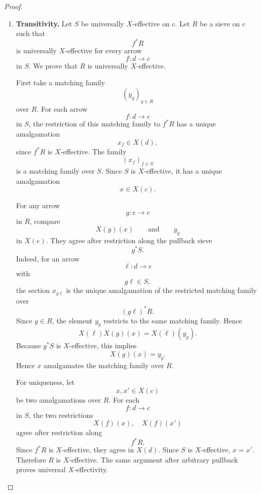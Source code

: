 \begin{proof}
\begin{enumerate}
        \item \textbf{Transitivity.}
        Let \(S\) be universally \(X\)-effective on \(c\). Let \(R\) be a
        sieve on \(c\) such that
        \[
            f^*R
        \]
        is universally \(X\)-effective for every arrow
        \[
            f:d\to c
        \]
        in \(S\). We prove that \(R\) is universally \(X\)-effective.

        First take a matching family
        \[
            (y_g)_{g\in R}
        \]
        over \(R\). For each arrow
        \[
            f:d\to c
        \]
        in \(S\), the restriction of this matching family to \(f^*R\) has a
        unique amalgamation
        \[
            x_f\in X(d),
        \]
        since \(f^*R\) is \(X\)-effective. The family
        \[
            (x_f)_{f\in S}
        \]
        is a matching family over \(S\). Since \(S\) is \(X\)-effective, it has
        a unique amalgamation
        \[
            x\in X(c).
        \]

        For any arrow
        \[
            g:e\to c
        \]
        in \(R\), compare
        \[
            X(g)(x)
            \qquad\text{and}\qquad
            y_g
        \]
        in \(X(e)\). They agree after restriction along the pullback sieve
        \[
            g^*S.
        \]
        Indeed, for an arrow
        \[
            \ell:d\to e
        \]
        with
        \[
            g\ell\in S,
        \]
        the section \(x_{g\ell}\) is the unique amalgamation of the restricted
        matching family over
        \[
            (g\ell)^*R.
        \]
        Since \(g\in R\), the element \(y_g\) restricts to the same matching
        family. Hence
        \[
            X(\ell)X(g)(x)=X(\ell)(y_g).
        \]
        Because \(g^*S\) is \(X\)-effective, this implies
        \[
            X(g)(x)=y_g.
        \]
        Hence \(x\) amalgamates the matching family over \(R\).

        For uniqueness, let
        \[
            x,x'\in X(c)
        \]
        be two amalgamations over \(R\). For each
        \[
            f:d\to c
        \]
        in \(S\), the two restrictions
        \[
            X(f)(x),\quad X(f)(x')
        \]
        agree after restriction along
        \[
            f^*R.
        \]
        Since \(f^*R\) is \(X\)-effective, they agree in \(X(d)\). Since \(S\)
        is \(X\)-effective, \(x=x'\). Therefore \(R\) is \(X\)-effective.
        The same argument after arbitrary pullback proves universal
        \(X\)-effectivity.


\end{enumerate}
\end{proof}

